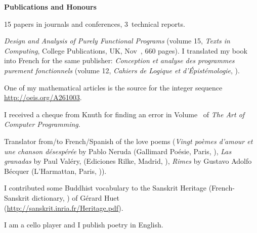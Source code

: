 \documentclass[a4paper,11pt]{article}
\begin{document}
\bigskip
\noindent\textbf{\large Publications and Honours}
\bigskip
\begin{itemize*}

  \item 15 papers in journals and conferences, 3~technical reports.

  \item \textit{Design and Analysis of Purely Functional Programs}
    (volume 15, \emph{Texts in Computing}, College Publications, UK,
    Nov~, 660 pages). I translated my book into
    French for the same publisher: \textit{Conception et analyse des
      programmes purement fonctionnels} (volume 12, \emph{Cahiers de
    Logique et d'Épistémologie}, ).

  \item One of my mathematical articles is the source for the integer
    sequence \url{http://oeis.org/A261003}.

  \item I received a cheque from Knuth for finding an error in
    Volume~ of \emph{The Art of Computer Programming}.

  \item Translator from/to French/Spanish of the love poems
    (\textit{Vingt po\`emes d'amour et une chanson d\'esesp\'er\'ee}
    by Pablo Neruda (Gallimard Po\'esie, Paris, ),
    \emph{Las granadas} by Paul Val\'ery, (Ediciones Rilke, Madrid,
    ), \textit{Rimes} by Gustavo Adolfo B\'ecquer
    (L'Harmattan, Paris, )).

  \item I contributed some Buddhist vocabulary to the Sanskrit
    Heritage (French-Sanskrit dictionary, ) of
    G\'{e}rard Huet\\ (\url{http://sanskrit.inria.fr/Heritage.pdf}).

  \item I am a cello player and I publish poetry in English.

\end{itemize*}


%
\nocite{*}
\end{document}
